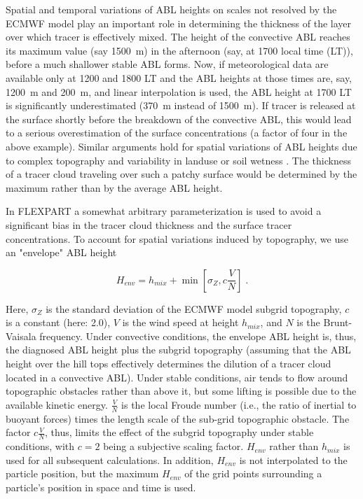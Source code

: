 \documentclass{egu}                  %
\begin{document}
Spatial and temporal variations of ABL heights on scales not resolved by the
ECMWF model play an important role in determining the thickness of the layer
over which tracer is effectively mixed.  The height of the convective ABL
reaches its maximum value (say 1500~m) in the afternoon (say, at 1700 local
time (LT)), before a much shallower stable ABL forms.  Now, if meteorological
data are available only at 1200 and 1800 LT and the ABL heights at those times
are, say, 1200~m and 200~m, and linear interpolation is used, the ABL height at
1700 LT is significantly underestimated (370~m instead of 1500~m).  If tracer
is released at the surface shortly before the breakdown of the convective ABL,
this would lead to a serious overestimation of the surface concentrations (a
factor of four in the above example).  Similar arguments hold for spatial
variations of ABL heights due to complex topography and variability in landuse
or soil wetness \citep{hubbe1997}.  The thickness of a tracer cloud traveling
over such a patchy surface would be determined by the maximum rather than by
the average ABL height.

In FLEXPART a somewhat arbitrary parameterization is used to avoid a
significant bias in the tracer cloud thickness and the surface tracer
concentrations.  To account for spatial variations induced by topography, we
use an "envelope" ABL height

\begin{equation}
H_{env}=h_{mix}+\min \left[\sigma_Z, c \frac{V}{N} \right]\; .
\end{equation}

Here, $\sigma_Z$ is the standard deviation of the ECMWF model subgrid
topography, $c$ is a constant (here: 2.0), $V$ is the wind speed at height
$h_{mix}$, and $N$ is the Brunt-Vaisala frequency.  Under convective
conditions, the envelope ABL height is, thus, the diagnosed ABL height plus the
subgrid topography (assuming that the ABL height over the hill tops effectively
determines the dilution of a tracer cloud located in a convective ABL).  Under
stable conditions, air tends to flow around topographic obstacles rather than
above it, but some lifting is possible due to the available kinetic energy.
$\frac{V}{N}$ is the local Froude number (i.e., the ratio of inertial to
buoyant forces) times the length scale of the sub-grid topographic obstacle.
The factor $c \frac{V}{N}$, thus, limits the effect of the subgrid topography
under stable conditions, with $c=2$ being a subjective scaling factor.
$H_{env}$ rather than $h_{mix}$ is used for all subsequent calculations.  In
addition, $H_{env}$ is not interpolated to the particle position, but the
maximum $H_{env}$ of the grid points surrounding a particle's position in space
and time is used.
\end{document}
